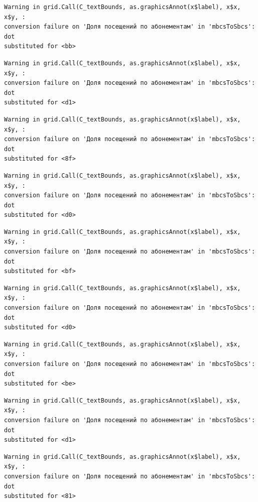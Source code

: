 \documentclass[
  letterpaper,
  DIV=11,
  numbers=noendperiod]{scrartcl}
\begin{document}
\begin{verbatim}
Warning in grid.Call(C_textBounds, as.graphicsAnnot(x$label), x$x, x$y, :
conversion failure on 'Доля посещений по абонементам' in 'mbcsToSbcs': dot
substituted for <bb>
\end{verbatim}

\begin{verbatim}
Warning in grid.Call(C_textBounds, as.graphicsAnnot(x$label), x$x, x$y, :
conversion failure on 'Доля посещений по абонементам' in 'mbcsToSbcs': dot
substituted for <d1>
\end{verbatim}

\begin{verbatim}
Warning in grid.Call(C_textBounds, as.graphicsAnnot(x$label), x$x, x$y, :
conversion failure on 'Доля посещений по абонементам' in 'mbcsToSbcs': dot
substituted for <8f>
\end{verbatim}

\begin{verbatim}
Warning in grid.Call(C_textBounds, as.graphicsAnnot(x$label), x$x, x$y, :
conversion failure on 'Доля посещений по абонементам' in 'mbcsToSbcs': dot
substituted for <d0>
\end{verbatim}

\begin{verbatim}
Warning in grid.Call(C_textBounds, as.graphicsAnnot(x$label), x$x, x$y, :
conversion failure on 'Доля посещений по абонементам' in 'mbcsToSbcs': dot
substituted for <bf>
\end{verbatim}

\begin{verbatim}
Warning in grid.Call(C_textBounds, as.graphicsAnnot(x$label), x$x, x$y, :
conversion failure on 'Доля посещений по абонементам' in 'mbcsToSbcs': dot
substituted for <d0>
\end{verbatim}

\begin{verbatim}
Warning in grid.Call(C_textBounds, as.graphicsAnnot(x$label), x$x, x$y, :
conversion failure on 'Доля посещений по абонементам' in 'mbcsToSbcs': dot
substituted for <be>
\end{verbatim}

\begin{verbatim}
Warning in grid.Call(C_textBounds, as.graphicsAnnot(x$label), x$x, x$y, :
conversion failure on 'Доля посещений по абонементам' in 'mbcsToSbcs': dot
substituted for <d1>
\end{verbatim}

\begin{verbatim}
Warning in grid.Call(C_textBounds, as.graphicsAnnot(x$label), x$x, x$y, :
conversion failure on 'Доля посещений по абонементам' in 'mbcsToSbcs': dot
substituted for <81>
\end{verbatim}
\end{document}
